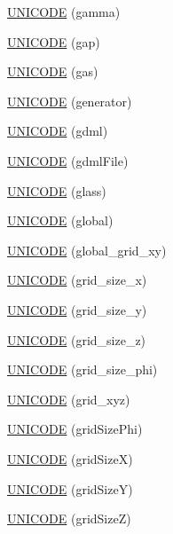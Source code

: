 \begin{DoxyCompactItemize}
\item 
\hyperlink{namespace_d_d4hep_1_1_x_m_l_a744d7ae136ffd3528f589a104752de4f}{UNICODE} (gamma)
\item 
\hyperlink{namespace_d_d4hep_1_1_x_m_l_aeafa1faf0f7298b41837dd9841fcaf63}{UNICODE} (gap)
\item 
\hyperlink{namespace_d_d4hep_1_1_x_m_l_a102278c6d3b1cfbcd3e483b11bd0c198}{UNICODE} (gas)
\item 
\hyperlink{namespace_d_d4hep_1_1_x_m_l_a21b2aa5d5d4e27c0c59ba7fab696f5b6}{UNICODE} (generator)
\item 
\hyperlink{namespace_d_d4hep_1_1_x_m_l_abed9c3c5916cb99ff3f6ffab1df6ab22}{UNICODE} (gdml)
\item 
\hyperlink{namespace_d_d4hep_1_1_x_m_l_ab1285488b0ccae0bab2f1c8fb7e77c28}{UNICODE} (gdmlFile)
\item 
\hyperlink{namespace_d_d4hep_1_1_x_m_l_a485b8ee2685bf8b06af49e131435affa}{UNICODE} (glass)
\item 
\hyperlink{namespace_d_d4hep_1_1_x_m_l_a8ed966ed38f2028ea807a52ec70fab6c}{UNICODE} (global)
\item 
\hyperlink{namespace_d_d4hep_1_1_x_m_l_af6d4ffc290b6e2dd3ef16118766f2fcf}{UNICODE} (global\_\-grid\_\-xy)
\item 
\hyperlink{namespace_d_d4hep_1_1_x_m_l_a01c980ae57b695952e6fc7c8e4db18af}{UNICODE} (grid\_\-size\_\-x)
\item 
\hyperlink{namespace_d_d4hep_1_1_x_m_l_a6d8f14edad61b6483f48a7db1400658b}{UNICODE} (grid\_\-size\_\-y)
\item 
\hyperlink{namespace_d_d4hep_1_1_x_m_l_a793789c9c6ec55782f2d1ee7d80422fb}{UNICODE} (grid\_\-size\_\-z)
\item 
\hyperlink{namespace_d_d4hep_1_1_x_m_l_ab3272b02facd035f55618a408197f97e}{UNICODE} (grid\_\-size\_\-phi)
\item 
\hyperlink{namespace_d_d4hep_1_1_x_m_l_a203e9791b2f513afbe5f25a2654256d1}{UNICODE} (grid\_\-xyz)
\item 
\hyperlink{namespace_d_d4hep_1_1_x_m_l_a17c2e56b6965d67107f701b2c3773a2e}{UNICODE} (gridSizePhi)
\item 
\hyperlink{namespace_d_d4hep_1_1_x_m_l_ac1c4ea3e1529768e7e4b95ad9c4beb98}{UNICODE} (gridSizeX)
\item 
\hyperlink{namespace_d_d4hep_1_1_x_m_l_a75b499a1ec97574e7cfebd2dd740e45a}{UNICODE} (gridSizeY)
\item 
\hyperlink{namespace_d_d4hep_1_1_x_m_l_af77ccf51a8d1562d65f7b916444d136a}{UNICODE} (gridSizeZ)
\item 

\end{DoxyCompactItemize}
